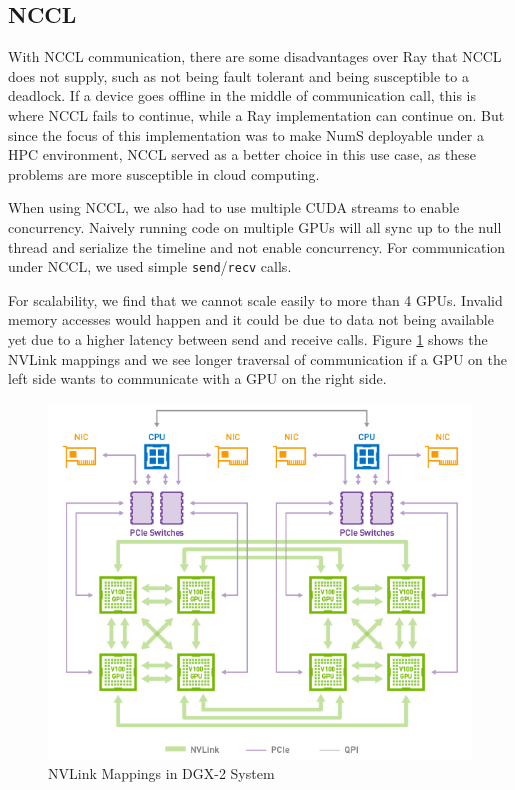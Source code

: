 \documentclass{article}
\begin{document}
\subsection{NCCL}
With NCCL communication, there are some disadvantages over Ray that NCCL does not supply, such as not being fault tolerant and being susceptible to a deadlock. If a device goes offline in the middle of communication call, this is where NCCL fails to continue, while a Ray implementation can continue on. But since the focus of this implementation was to make NumS deployable under a HPC environment, NCCL served as a better choice in this use case, as these problems are more susceptible in cloud computing. 

When using NCCL, we also had to use multiple CUDA streams to enable concurrency. Naively running code on multiple GPUs will all sync up to the null thread and serialize the timeline and not enable concurrency. For communication under NCCL, we used simple \verb|send|/\verb|recv| calls.

For scalability, we find that we cannot scale easily to more than 4 GPUs. Invalid memory accesses would happen and it could be due to data not being available yet due to a higher latency between send and receive calls. Figure \ref{fig:nvlink} shows the NVLink mappings and we see longer traversal of communication if a GPU on the left side wants to communicate with a GPU on the right side. 

\begin{figure}
  \centerline{\includegraphics[width=5in]{figures/nvlink.png}}
  \caption{NVLink Mappings in DGX-2 System}
  \label{fig:nvlink}
\end{figure}
\end{document}
